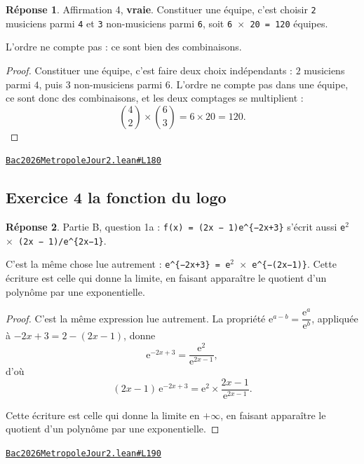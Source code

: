 \documentclass[11pt,a4paper]{article}
\theoremstyle{definition}
\theoremstyle{plain}
\theoremstyle{definition}
\newtheorem*{reponse}{Réponse}
\newcommand{\source}[2]{\par\smallskip\noindent\hfill{\footnotesize\href{#1}{\texttt{#2}}}\par\smallskip}
\begin{document}
\begin{reponse}
Affirmation 4, \textbf{vraie}. Constituer une équipe, c'est choisir \texttt{2} musiciens parmi
\texttt{4} et \texttt{3} non-musiciens parmi \texttt{6}, soit \texttt{6 \(\times\) 20 = 120} équipes.

L'ordre ne compte pas : ce sont bien des combinaisons.
\end{reponse}
\begin{proof}
Constituer une équipe, c'est faire deux choix indépendants : $2$ musiciens parmi $4$, puis
$3$ non-musiciens parmi $6$. L'ordre ne compte pas dans une équipe, ce sont donc des
combinaisons, et les deux comptages se multiplient :
\[ \binom{4}{2} \times \binom{6}{3} = 6 \times 20 = 120 . \]
\end{proof}
\source{https://github.com/Commutator-IO/learn-lean/blob/main/exams/2026/Bac2026MetropoleJour2.lean\#L180}{Bac2026MetropoleJour2.lean\#L180}

\subsection{Exercice 4 \textemdash{} la fonction du logo}

\begin{reponse}
Partie B, question 1a : \texttt{f(x) = (2x − 1)e\textasciicircum{}\{−2x+3\}} s'écrit aussi
\texttt{e\(^{2}\) \(\times\) (2x − 1)/e\textasciicircum{}\{2x−1\}}.

C'est la même chose lue autrement : \texttt{e\textasciicircum{}\{−2x+3\} = e\(^{2}\) \(\times\) e\textasciicircum{}\{−(2x−1)\}}. Cette écriture est
celle qui donne la limite, en faisant apparaître le quotient d'un polynôme par une
exponentielle.
\end{reponse}
\begin{proof}
C'est la même expression lue autrement. La propriété
$\mathrm{e}^{a-b} = \dfrac{\mathrm{e}^a}{\mathrm{e}^b}$, appliquée à
$-2x + 3 = 2 - (2x - 1)$, donne
\[ \mathrm{e}^{-2x+3} = \frac{\mathrm{e}^{2}}{\mathrm{e}^{2x-1}} , \]
d'où
\[ (2x - 1)\,\mathrm{e}^{-2x+3}
   = \mathrm{e}^{2} \times \frac{2x - 1}{\mathrm{e}^{2x-1}} . \]

Cette écriture est celle qui donne la limite en $+\infty$, en faisant apparaître le
quotient d'un polynôme par une exponentielle.
\end{proof}
\source{https://github.com/Commutator-IO/learn-lean/blob/main/exams/2026/Bac2026MetropoleJour2.lean\#L190}{Bac2026MetropoleJour2.lean\#L190}
\end{document}
